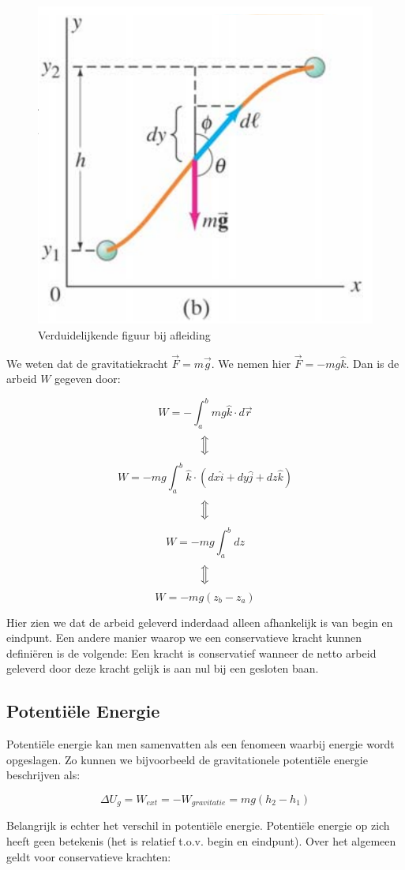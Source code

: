 \documentclass[12pt,a4paper]{article}
\newcommand{\Luda}{\Big\Updownarrow}
\begin{document}
    \begin{figure}[h]
    	\centering
	\includegraphics[width=0.6\linewidth]{zwaartekracht_conservatief}
    	\caption{Verduidelijkende figuur bij afleiding}
        	\label{zwaartekracht_conservatief}
    \end{figure}

    We weten dat de gravitatiekracht $\vec{F} = m\vec{g}$. We nemen hier $\vec{F} = -mg\hat{k}$. 
    Dan is de arbeid $W$ gegeven door:
    
    $$W = -\int_{a}^{b}mg\hat{k} \cdot d\vec{r}$$
    $$\Luda$$
    $$W = -mg\int_{a}^{b}\hat{k}\cdot (dx\hat{i} + dy\hat{j} + dz\hat{k})$$
    $$\Luda$$
    $$W = -mg\int_{a}^{b}dz$$
    $$\Luda$$
    $$W = -mg(z_b - z_a)$$

    Hier zien we dat de arbeid geleverd inderdaad alleen afhankelijk is van begin en eindpunt. Een andere manier waarop
    we een conservatieve kracht kunnen definiëren is de volgende: Een kracht is conservatief wanneer de netto arbeid geleverd
    door deze kracht gelijk is aan nul bij een gesloten baan. 
    
    \subsection{Potentiële Energie}
    Potentiële energie kan men samenvatten als een fenomeen waarbij energie wordt opgeslagen. Zo kunnen we bijvoorbeeld
    de gravitationele potentiële energie beschrijven als:
    
    $$\Delta U_g = W_{ext} = -W_{gravitatie} = mg(h_2 - h_1)$$
    
    Belangrijk is echter het verschil in potentiële energie. Potentiële energie op zich heeft geen betekenis (het is relatief t.o.v.
    begin en eindpunt). Over het algemeen geldt voor conservatieve krachten:
    
\end{document}
